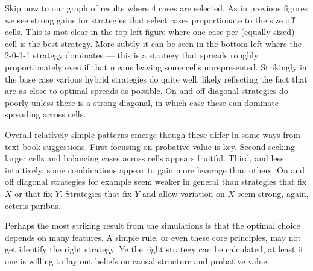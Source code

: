 \documentclass[12pt,]{book}
\begin{document}
Skip now to our graph of results where 4 cases are selected. As in previous figures we see strong gains for strategies that select cases proportionate to the size off cells. This is mot clear in the top left figure where one case per (equally sized) cell is the best strategy. More subtly it can be seen in the bottom left where the 2-0-1-1 strategy dominates --- this is a strategy that spreads roughly proportionately even if that means leaving some cells unrepresented. Strikingly in the base case various hybrid strategies do quite well, likely reflecting the fact that are as close to optimal spreads as possible. On and off diagonal strategies do poorly unless there is a strong diagonal, in which case these can dominate spreading across cells.

Overall relatively simple patterns emerge though these differ in some ways from text book suggestions. First focusing on probative value is key. Second seeking larger cells and balancing cases across cells appears fruitful. Third, and less intuitively, some combinations appear to gain more leverage than others. On and off diagonal strategies for example seem weaker in general than strategies that fix \(X\) or that fix \(Y\). Strategies that fix \(Y\) and allow variation on \(X\) seem strong, again, ceteris paribus.

Perhaps the most striking result from the simulations is that the optimal choice depends on many features. A simple rule, or even these core principles, may not get identify the right strategy. Ye the right strategy can be calculated, at least if one is willing to lay out beliefs on causal structure and probative value.
\end{document}
